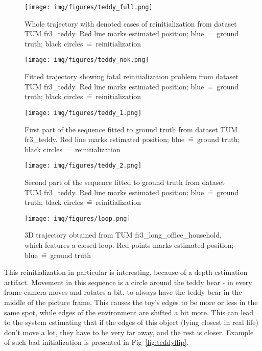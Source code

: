 \begin{figure}[ht]
	\centering\texttt{[image: img/figures/teddy\_full.png]}
	\caption{ Whole trajectory with denoted cases of reinitialization from dataset TUM fr3\_teddy. Red line marks estimated position; blue~\==~ground truth; black circles~\==~reinitialization }
	\label{fig:teddyfull}
\end{figure}
\begin{figure}[ht]
	\centering\texttt{[image: img/figures/teddy\_nok.png]}
	\caption{ Fitted trajectory showing fatal reinitialization problem from dataset TUM fr3\_teddy. Red line marks estimated position; blue~\==~ground truth; black circles~\==~reinitialization }
	\label{fig:teddynok}
\end{figure}
\begin{figure}[ht]
	\centering\texttt{[image: img/figures/teddy\_1.png]}
	\caption{ First part of the sequence fitted to ground truth from dataset TUM fr3\_teddy. Red line marks estimated position; blue~\==~ground truth; black circles~\==~reinitialization }
	\label{fig:teddy1}
\end{figure}
\begin{figure}[ht]
	\centering\texttt{[image: img/figures/teddy\_2.png]}
	\caption{ Second part of the sequence fitted to ground truth from dataset TUM fr3\_teddy. Red line marks estimated position; blue~\==~ground truth; black circles~\==~reinitialization }
	\label{fig:teddy2}
\end{figure}


\begin{figure}[ht]
	\centering\texttt{[image: img/figures/loop.png]}
	\caption{ 3D trajectory obtained from TUM fr3\_long\_office\_household, which features a closed loop. Red points marks estimated position; blue~\==~ground truth }
	\label{fig:loop}
\end{figure}

This reinitialization in particular is interesting, because of a depth estimation artifact. Movement in this sequence is a circle around the teddy bear - in every frame camera moves and rotates a bit, to always have the teddy bear in the middle of the picture frame. This causes the toy's edges to be more or less in the same spot, while edges of the environment are shifted a bit more. This can lead to the system estimating that if the edges of this object (lying closest in real life) don't move a lot, they have to be very far away, and the rest is closer. Example of such bad initialization is presented in Fig~\ref{fig:teddyflip}.


